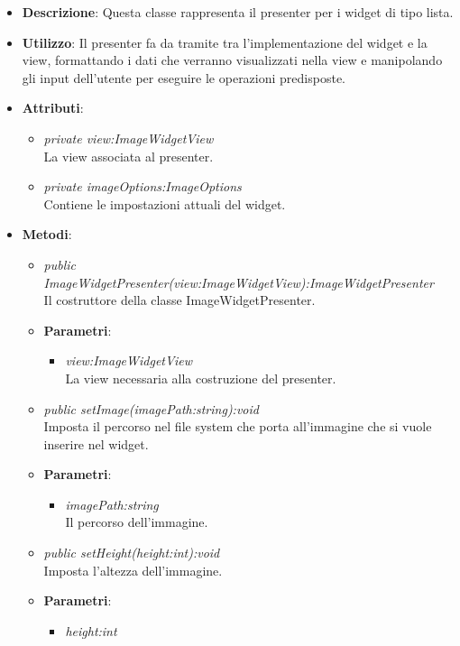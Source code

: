 \begin{itemize}
\item \textbf{Descrizione}: Questa classe rappresenta il presenter per i widget di tipo lista.
\item \textbf{Utilizzo}: Il presenter fa da tramite tra l'implementazione del widget e la view, formattando i dati che verranno visualizzati nella view e manipolando gli input dell'utente per eseguire le operazioni predisposte.
\item \textbf{Attributi}:
	\begin{itemize}
	\item \textit{private view:ImageWidgetView}\\
	La view associata al presenter.
	\item \textit{private imageOptions:ImageOptions}\\
	Contiene le impostazioni attuali del widget.
	\end{itemize}
\item \textbf{Metodi}:
	\begin{itemize}
	\item \textit{public ImageWidgetPresenter(view:ImageWidgetView):ImageWidgetPresenter}\\
	Il costruttore della classe ImageWidgetPresenter.
		\item{\textbf{Parametri}: \begin{itemize}
		\item \textit{view:ImageWidgetView}\\
		La view necessaria alla costruzione del presenter.
		\end{itemize}}
	\item \textit{public setImage(imagePath:string):void}\\
	Imposta il percorso nel file system che porta all'immagine che si vuole inserire nel widget.
		\item{\textbf{Parametri}: \begin{itemize}
		\item \textit{imagePath:string}\\
		Il percorso dell'immagine.
		\end{itemize}}
	\item \textit{public setHeight(height:int):void}\\
	Imposta l'altezza dell'immagine.
		\item{\textbf{Parametri}: \begin{itemize}
		\item \textit{height:int}\\

\end{itemize}}
\end{itemize}
\end{itemize}
